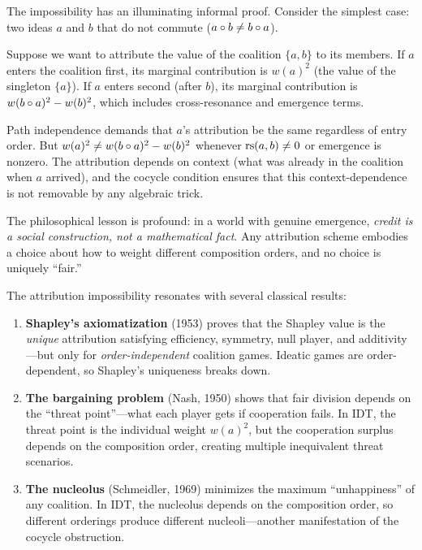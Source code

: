 \begin{remark}
\label{rem:attribution-intuition}
The impossibility has an illuminating informal proof.  Consider the simplest
case: two ideas $a$ and $b$ that do not commute ($a \circ b \neq b
\circ a$).

Suppose we want to attribute the value of the coalition $\{a, b\}$ to
its members.  If $a$ enters the coalition first, its marginal contribution
is $w(a)^2$ (the value of the singleton $\{a\}$).  If $a$ enters second
(after $b$), its marginal contribution is $w(b \circ a)^2 - w(b)^2$,
which includes cross-resonance and emergence terms.

Path independence demands that $a$'s attribution be the same regardless of
entry order.  But $w(a)^2 \neq w(b \circ a)^2 - w(b)^2$ whenever
$\mathrm{rs}(a, b) \neq 0$ or emergence is nonzero.  The attribution depends on
context (what was already in the coalition when $a$ arrived), and the
cocycle condition ensures that this context-dependence is not removable
by any algebraic trick.

The philosophical lesson is profound: in a world with genuine emergence,
\emph{credit is a social construction, not a mathematical fact}.  Any
attribution scheme embodies a choice about how to weight different
composition orders, and no choice is uniquely ``fair.''
\end{remark}

\begin{remark}
\label{rem:cooperative-game-theory}
The attribution impossibility resonates with several classical results:

\begin{enumerate}
  \item \textbf{Shapley's axiomatization} (1953) proves that the Shapley
        value is the \emph{unique} attribution satisfying efficiency,
        symmetry, null player, and additivity---but only for
        \emph{order-independent} coalition games.  Ideatic games are
        order-dependent, so Shapley's uniqueness breaks down.

  \item \textbf{The bargaining problem} (Nash, 1950) shows that fair
        division depends on the ``threat point''---what each player gets
        if cooperation fails.  In IDT, the threat point is the
        individual weight $w(a)^2$, but the cooperation surplus depends
        on the composition order, creating multiple inequivalent threat
        scenarios.

  \item \textbf{The nucleolus} (Schmeidler, 1969) minimizes the maximum
        ``unhappiness'' of any coalition.  In IDT, the nucleolus depends
        on the composition order, so different orderings produce different
        nucleoli---another manifestation of the cocycle obstruction.
\end{enumerate}
\end{remark}


